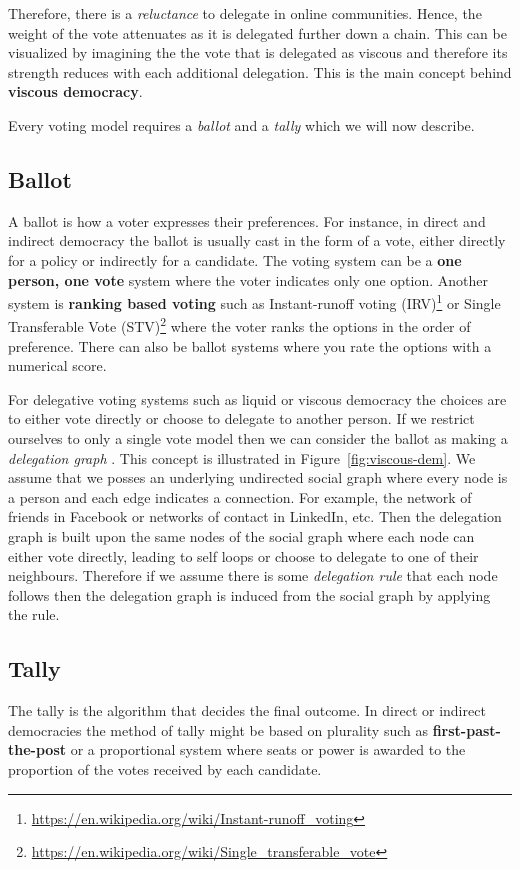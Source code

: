 Therefore, there is a \textit{reluctance} to delegate in online communities. Hence, the weight of the vote attenuates as it is delegated further down a chain. This can be visualized by imagining the the vote that is delegated as viscous and therefore its strength reduces with each additional delegation. This is the main concept behind \textbf{viscous democracy}. 

Every voting model requires a \emph{ballot} and a \emph{tally} which we will now describe.

\subsection{Ballot}
A ballot is how a voter expresses their preferences. For instance, in direct and indirect democracy the ballot is usually cast in the form of a vote, either directly for a policy or indirectly for a candidate. The voting system can be a \textbf{one person, one vote} system where the voter indicates only one option. Another system is \textbf{ranking based voting} such as Instant-runoff voting (IRV)\footnote{\url{https://en.wikipedia.org/wiki/Instant-runoff_voting}} or Single Transferable Vote (STV)\footnote{\url{https://en.wikipedia.org/wiki/Single_transferable_vote}} where the voter ranks the options in the order of preference. There can also be ballot systems where you rate the options with a numerical score.

For delegative voting systems such as liquid or viscous democracy the choices are to either vote directly or choose to delegate to another person. If we restrict ourselves to only a single vote model then we can consider the ballot as making a \textit{delegation graph} \cite{ViscousDemocracy}. This concept is illustrated in Figure~\ref{fig:viscous-dem}. We assume that we posses an underlying undirected social graph where every node is a person and each edge indicates a connection. For example, the network of friends in Facebook or networks of contact in LinkedIn, etc. Then the delegation graph is built upon the same nodes of the social graph where each node can either vote directly, leading to self loops or choose to delegate to one of their neighbours. Therefore if we assume there is some \textit{delegation rule} that each node follows then the delegation graph is induced from the social graph by applying the rule. 

\subsection{Tally}
\label{sec:tally}
The tally is the algorithm that decides the final outcome. In direct or indirect democracies the method of tally might be based on plurality such as \textbf{first-past-the-post} or a proportional system where seats or power is awarded to the proportion of the votes received by each candidate. 
 
